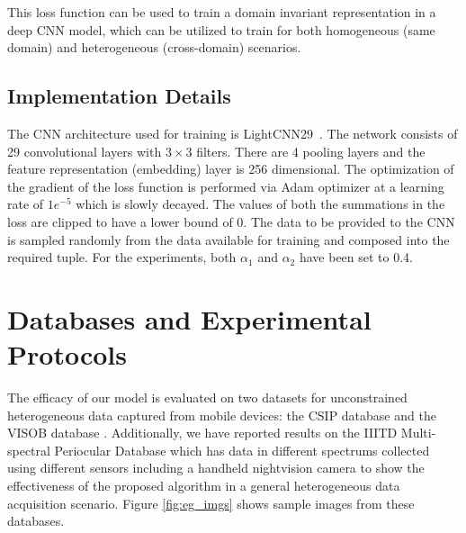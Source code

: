 \documentclass[10pt,twocolumn,letterpaper]{article}
\begin{document}
This loss function can be used to train a domain invariant representation in a deep CNN model, which can be utilized to train for both homogeneous (same domain) and heterogeneous (cross-domain) scenarios. 

\subsection{Implementation Details}
The CNN architecture used for training is LightCNN29~\cite{wu2018light}. The network consists of 29 convolutional layers with $3 \times 3$ filters. There are 4 pooling layers and the feature representation (embedding) layer is 256 dimensional. 
The optimization of the gradient of the loss function is performed via Adam optimizer \cite{kingma2014adam} at a learning rate of $1e^{-5}$ which is slowly decayed. The values of both the summations in the loss are clipped to have a lower bound of 0. The data to be provided to the CNN is sampled randomly from the data available for training and composed into the required tuple. For the experiments, both $\alpha_1$ and $\alpha_2$ have been set to 0.4. 

\section{Databases and Experimental Protocols}
\label{sec:dbase}
  \vspace{-4pt}
The efficacy of our model is evaluated on two datasets for unconstrained heterogeneous data captured from mobile devices: the CSIP database \cite{santos2015fusing} and the VISOB database \cite{VISOB_Dataset}. Additionally, we have reported results on the IIITD Multi-spectral Periocular Database \cite{sharma2014cross} which has data in different spectrums collected using different sensors including a handheld nightvision camera to show the effectiveness of the proposed algorithm in a general heterogeneous data acquisition scenario. Figure \ref{fig:eg_imgs} shows sample images from these databases.
\end{document}

